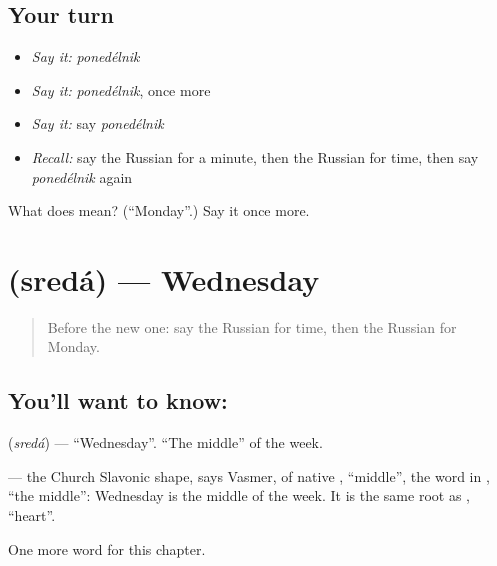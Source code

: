\subsection*{Your turn}
\begin{itemize}
\raggedright
  \item \emph{Say it:} \emph{ponedélnik}
  \item \emph{Say it:} \emph{ponedélnik}, once more
  \item \emph{Say it:} say \emph{ponedélnik}
  \item \emph{Recall:} say the Russian for a minute, then the Russian for time, then say \emph{ponedélnik} again
\end{itemize}

\begin{tcolorbox}[breakable,colback=teal!4,colframe=teal!35!black,title={Before you move on}]
What does  mean? (\textquotedblleft{}Monday\textquotedblright{}.) Say it once more.
\end{tcolorbox}
\section[\texorpdfstring{\ru{среда} (sredá)}{среда (sredá)}]{ (sredá) — Wednesday}

\label{lesson:RU-C70-wednesday}



\begin{quote}
Before the new one: say the Russian for time, then the Russian for Monday.
\end{quote}

\subsection*{You'll want to know: }
\textbf{} (\emph{sredá}) — \textquotedblleft{}Wednesday\textquotedblright{}. \textquotedblleft{}The middle\textquotedblright{} of the week.

\begin{cousinweb}
\textbf{} — the Church Slavonic shape, says Vasmer, of native \emph{}, \textquotedblleft{}middle\textquotedblright{}, the word in \emph{}, \textquotedblleft{}the middle\textquotedblright{}: Wednesday is the middle of the week. It is the same root as \emph{}, \textquotedblleft{}heart\textquotedblright{}.
\end{cousinweb}

\begin{grammarlens}[title={What you've built}]
One more word for this chapter.
\end{grammarlens}


